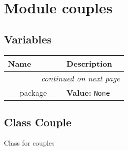 %
%
%


\section{Module couples}

    \label{couples}


  \subsection{Variables}

    \vspace{-1cm}
\hspace{\varindent}\begin{longtable}{|p{\varnamewidth}|p{\vardescrwidth}|l}
\cline{1-2}
\cline{1-2} \centering \textbf{Name} & \centering \textbf{Description}& \\
\cline{1-2}
\endhead\cline{1-2}\multicolumn{3}{r}{\small\textit{continued on next page}}\\\endfoot\cline{1-2}
\endlastfoot\raggedright \_\-\_\-p\-a\-c\-k\-a\-g\-e\-\_\-\_\- & \raggedright \textbf{Value:} 
{\tt None}&\\
\cline{1-2}
\end{longtable}



\subsection{Class Couple}

    \label{couples:Couple}
Class for couples


